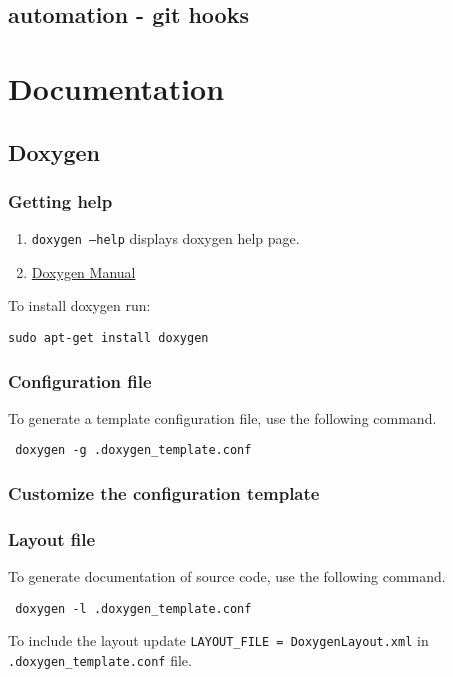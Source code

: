 \subsection{automation - git hooks}

\section{Documentation}
\subsection{Doxygen}

\subsubsection{Getting help}

\begin{enumerate}
  \item \texttt{doxygen --help} displays doxygen help page.
  \item \href{https://doxygen.nl/manual/index.html}{Doxygen Manual}
\end{enumerate}

To install doxygen run:

\texttt{sudo apt-get install doxygen}

\subsubsection{Configuration file}

To generate a template configuration file, use the following command.

\texttt{ doxygen -g .doxygen\_template.conf}

\subsubsection{Customize the configuration template}

\subsubsection{Layout file}

To generate documentation of source code, use the following command.

\texttt{ doxygen -l .doxygen\_template.conf}

To include the layout update \texttt{LAYOUT\_FILE            = DoxygenLayout.xml} in \texttt{.doxygen\_template.conf} file.

